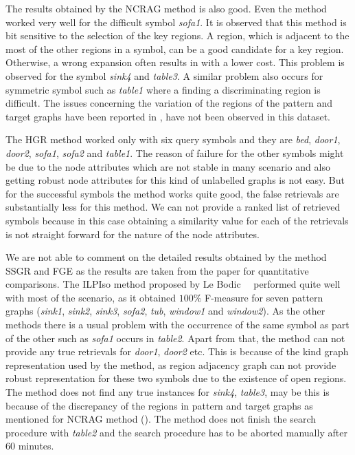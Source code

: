 The results obtained by the NCRAG method is also good. Even the method worked very well for the difficult symbol \emph{sofa1}. It is observed that this method is bit sensitive to the selection of the key regions. A region, which is adjacent to the most of the other regions in a symbol, can be a good candidate for a key region. Otherwise, a wrong expansion often results in with a lower cost. This problem is observed for the symbol \emph{sink4} and \emph{table3}. A similar problem also occurs for symmetric symbol such as \emph{table1} where a finding a discriminating region is difficult. The issues concerning the variation of the regions of the pattern and target graphs have been reported in , have not been observed in this dataset.

The HGR method worked only with six query symbols and they are \emph{bed}, \emph{door1}, \emph{door2}, \emph{sofa1}, \emph{sofa2} and \emph{table1}. The reason of failure for the other symbols might be due to the node attributes which are not stable in many scenario and also getting robust node attributes for this kind of unlabelled graphs is not easy. But for the successful symbols the method works quite good, the false retrievals are substantially less for this method. We can not provide a ranked list of retrieved symbols because in this case obtaining a similarity value for each of the retrievals is not straight forward for the nature of the node attributes.

We are not able to comment on the detailed results obtained by the method SSGR and FGE as the results are taken from the paper for quantitative comparisons. The ILPIso method proposed by Le Bodic~\etal~ performed quite well with most of the scenario, as it obtained $100\%$ F-measure for seven pattern graphs (\emph{sink1}, \emph{sink2}, \emph{sink3}, \emph{sofa2}, \emph{tub}, \emph{window1} and \emph{window2}). As the other methods there is a usual problem with the occurrence of the same symbol as part of the other such as \emph{sofa1} occurs in \emph{table2}. Apart from that, the method can not provide any true retrievals for \emph{door1}, \emph{door2} etc. This is because of the kind graph representation used by the method, as region adjacency graph can not provide robust representation for these two symbols due to the existence of open regions. The method does not find any true instances for \emph{sink4}, \emph{table3}, may be this is because of the discrepancy of the regions in pattern and target graphs as mentioned for NCRAG method (). The method does not finish the search procedure with \emph{table2} and the search procedure has to be aborted manually after 60 minutes.


